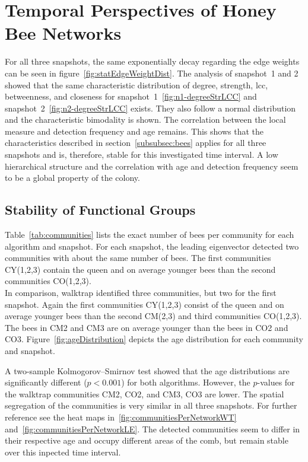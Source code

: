 \section{Temporal Perspectives of Honey Bee Networks}

For all three snapshots, the same exponentially decay regarding the edge weights can be seen in figure~\ref{fig:statEdgeWeightDist}.
The analysis of snapshot~1 and 2 showed that the same characteristic distribution of degree, strength, lcc, betweenness, and closeness for snapshot~1~\ref{fig:n1-degreeStrLCC} and snapshot~2~\ref{fig:n2-degreeStrLCC} exists. They also follow a normal distribution and the characteristic bimodality is shown. The correlation between the local measure and detection frequency and age remains.
This shows that the characteristics described in section~\ref{subsubsec:bees} applies for all three snapshots and is, therefore, stable for this investigated time interval. A low hierarchical structure and the correlation with age and detection frequency seem to be a global property of the colony.

\subsection{Stability of Functional Groups}
Table~\ref{tab:communities} lists the exact number of bees per community for each algorithm and snapshot.
For each snapshot, the leading eigenvector detected two communities with about the same number of bees.
The first communities CY(1,2,3) contain the queen and on average younger bees than the second communities CO(1,2,3).\\
In comparison, walktrap identified three communities, but two for the first snapshot.
Again the first communities CY(1,2,3) consist of the queen and on average younger bees than the second CM(2,3) and third communities CO(1,2,3).
The bees in CM2 and CM3 are on average younger than the bees in CO2 and CO3.
Figure~\ref{fig:ageDistribution} depicts the age distribution for each community and snapshot.

A two-sample Kolmogorov–Smirnov test showed that the age distributions are significantly different ($p< 0.001$) for both algorithms. However, the $p$-values for the walktrap communities CM2, CO2, and CM3, CO3 are lower.
The spatial segregation of the communities is very similar in all three snapshots. For further reference see the heat maps in~\ref{fig:communitiesPerNetworkWT} and~\ref{fig:communitiesPerNetworkLE}.
The detected communities seem to differ in their respective age and occupy different areas of the comb, but remain stable over this inpected time interval.

